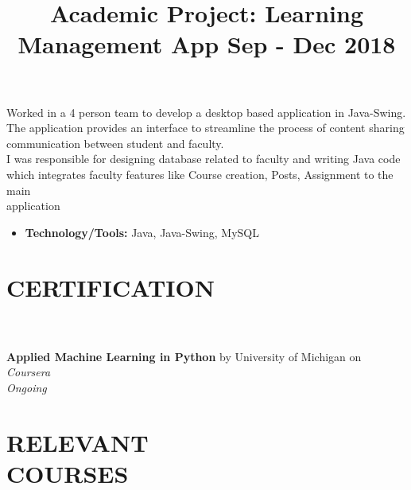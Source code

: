 \documentclass[margin]{res}
\begin{document}
\begin{resume}
\location{}
\title{\textbf{Academic Project: Learning Management App \hfill Sep - Dec 2018}
 }
\begin{position}
Worked in a 4 person team to develop a desktop based application in Java-Swing. The application provides an interface to streamline the process of content sharing communication between student and faculty.\\
I was responsible for designing database related to faculty and writing Java code which integrates faculty features like Course creation, Posts, Assignment to the main \\application
\begin{itemize}
\item \textbf{Technology/Tools:} Java, Java-Swing, MySQL
\end{itemize}
\end{position}


\section{CERTIFICATION}
\par
{}
\\
\\
\textbullet{} \textbf{Applied Machine Learning in Python} by University of Michigan on \sl{Coursera} \\ Ongoing


\section{RELEVANT\\COURSES}
\par



\end{resume}
\end{document}
